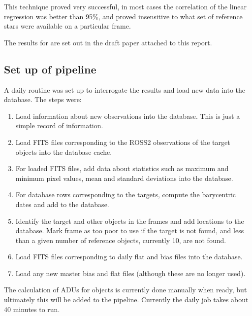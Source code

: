This technique proved very successful, in most cases the correlation of the
linear regression was better than 95\%, and proved insensitive to what set of
reference stars were available on a particular frame.

The results for {\ross} are set out in the draft paper attached to this report.

\subsection{Set up of pipeline}
\protect\label{section:pipeline}

A daily routine was set up to interrogate the {\rem} results and load new data
into the database. The steps were:

\begin{enumerate}
  \item Load information about new observations into the database. This is just
  a simple record of information.
  \item Load FITS files corresponding to the ROSS2 observations of the target
  objects into the database cache.
  \item For loaded FITS files, add data about statistics such as maximum and
  minimum pixel values, mean and standard deviations into the database.
  \item For database rows corresponding to the targets, compute the barycentric
  dates and add to the database.
  \item Identify the target and other objects in the frames and add locations to
  the database. Mark frame as too poor to use if the target is not found, and
  less than a given number of reference objects, currently 10, are not found.
  \item Load FITS files corresponding to daily flat and bias files into the
  database.
  \item Load any new master bias and flat files (although these are no longer
  used).
\end{enumerate}

The calculation of ADUs for objects is currently done manually when ready, but
ultimately this will be added to the pipeline. Currently the daily job takes
about 40 minutes to run.
